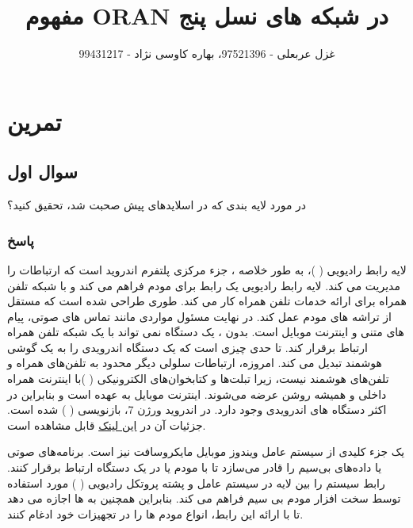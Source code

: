 \documentclass[landscape, 12pt]{report}
\title{مفهوم
	ORAN
	در شبکه های نسل پنج
}
\author{غزل عربعلی - 97521396، بهاره کاوسی نژاد - 99431217}
\begin{document}
\maketitle
{}
\chapter*{تمرین 
}

\section*{سوال اول}
در مورد لایه بندی
  که در اسلایدهای پیش صحبت شد، تحقیق کنید؟

\subsection*{پاسخ}
لایه رابط رادیویی (
)، به طور خلاصه
 ، جزء مرکزی پلتفرم اندروید است که ارتباطات 
 را مدیریت می کند. لایه رابط رادیویی یک رابط برای مودم 
  فراهم می کند و با شبکه تلفن همراه برای ارائه خدمات تلفن همراه کار می کند.
    طوری طراحی شده است که مستقل از تراشه های مودم 
     عمل کند. در نهایت 
      مسئول مواردی مانند تماس های صوتی، پیام های متنی و اینترنت موبایل است. بدون 
      ، یک دستگاه
        نمی تواند با یک شبکه تلفن همراه ارتباط برقرار کند. 
         تا حدی چیزی است که یک دستگاه اندرویدی را به یک گوشی هوشمند تبدیل می کند. امروزه، ارتباطات سلولی دیگر محدود به تلفن‌های همراه و تلفن‌های هوشمند نیست، زیرا تبلت‌ها و کتابخوان‌های الکترونیکی (
         )با اینترنت همراه داخلی و همیشه روشن عرضه می‌شوند. اینترنت موبایل به عهده 
          است و بنابراین
            در اکثر دستگاه های اندرویدی وجود دارد.
            در اندروید ورژن 7،
            بازنویسی (
            )
            شده است. جزئیات آن در  
            \href{https://source.android.com/docs/core/connect/ril} {این لینک}
            قابل مشاهده است.
            
             یک جزء کلیدی از سیستم عامل ویندوز موبایل مایکروسافت نیز است.
               برنامه‌های صوتی یا داده‌های بی‌سیم را قادر می‌سازد تا با مودم
                 یا
                  در یک دستگاه
                    ارتباط برقرار کنند.
                     رابط سیستم را بین لایه
                       در سیستم عامل 
                        و پشته پروتکل رادیویی (
                        ) مورد استفاده توسط سخت افزار مودم بی سیم فراهم می کند. بنابراین 
                         همچنین به
                           ها اجازه می دهد تا با ارائه این رابط، انواع مودم ها را در تجهیزات خود ادغام کنند.
            
\end{document}
